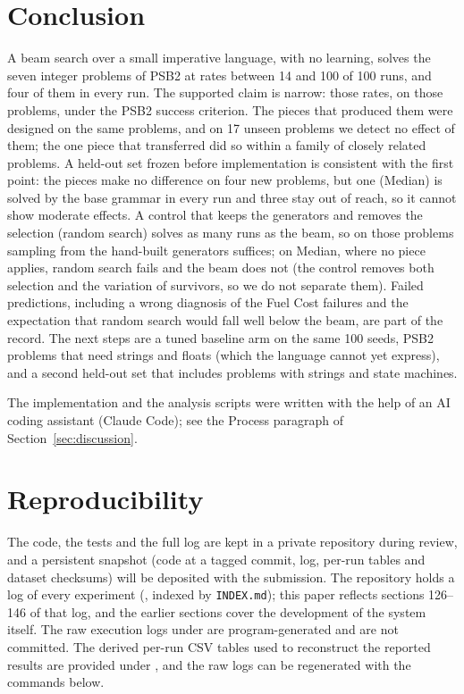 \documentclass[sigconf,nonacm]{acmart}
\begin{document}
\section{Conclusion}
A beam search over a small imperative language, with no learning, solves the seven integer problems of PSB2 at rates between 14 and 100 of 100
runs, and four of them in every run. The supported claim is narrow: those rates, on those problems, under the PSB2 success criterion. The
pieces that produced them were designed on the same problems, and on 17 unseen problems we detect no effect of them; the one
piece that transferred did so within a family of closely related problems. A held-out set frozen before implementation is consistent with the first point: the pieces make no difference on four new problems, but one (Median) is solved by the base grammar in every run and three stay out of reach, so it cannot show moderate effects. A control that keeps the generators and removes the selection
(random search) solves as many runs as the beam, so on those problems sampling from the hand-built generators suffices; on Median, where no piece applies, random search fails and the beam does not (the control removes both selection and the variation of survivors, so we do not separate them). Failed predictions, including a wrong diagnosis of the Fuel
Cost failures and the expectation that random search would fall well below the beam, are part of the record. The next steps are a tuned baseline arm on the same 100 seeds, PSB2 problems that need strings and
floats (which the language cannot yet express), and a second held-out set that includes problems with strings and state machines.

\begin{acks}
The implementation and the analysis scripts were written with the help of an AI coding assistant (Claude Code); see the Process paragraph of Section~\ref{sec:discussion}.
\end{acks}




\appendix
\section{Reproducibility}
\label{app:repro}
The code, the tests and the full log are kept in a private repository during review, and a persistent snapshot (code at a tagged commit, log, per-run tables and dataset checksums) will be deposited with the submission. The repository holds a log of every experiment (, indexed by \texttt{INDEX.md}); this paper reflects
sections 126--146 of that log, and the earlier sections cover the development of the system itself. The raw execution logs under  are program-generated and are not committed. The derived per-run CSV tables used to reconstruct the reported results are provided under , and the raw logs can be regenerated with the commands below.
\end{document}
